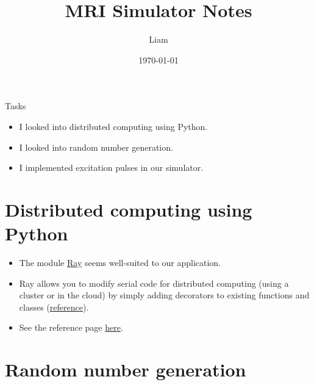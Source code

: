 \documentclass[dvipsnames]{beamer}
\title{MRI Simulator Notes}
\author{Liam}
\date{\today}
\begin{document}
\begin{frame}
\maketitle
\end{frame}

\begin{frame}{Tasks}
\begin{itemize}
\item I looked into distributed computing using Python.
\item I looked into random number generation.
\item I implemented excitation pulses in our simulator.
\end{itemize}
\end{frame}

\section{Distributed computing using Python}

\begin{frame}
\begin{itemize}
\item The module \href{https://github.com/ray-project/ray}{Ray} seems well-suited to our application.
\item Ray allows you to modify serial code for distributed computing (using a cluster or in the cloud) by simply adding decorators to existing functions and classes (\href{https://towardsdatascience.com/modern-parallel-and-distributed-python-a-quick-tutorial-on-ray-99f8d70369b8}{reference}).
\item See the reference page \href{https://ray.readthedocs.io/en/latest/}{here}.
\end{itemize}
\end{frame}

\section{Random number generation}
\end{document}
